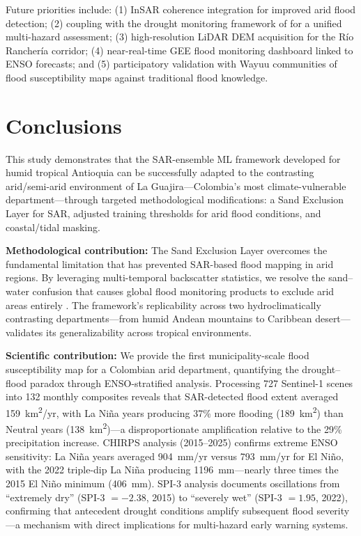 \documentclass{article}
\begin{document}
Future priorities include: (1) InSAR coherence integration for improved arid flood detection; (2) coupling with the drought monitoring framework of \citet{MeraGomez2021} for a unified multi-hazard assessment; (3) high-resolution LiDAR DEM acquisition for the R\'io Rancher\'ia corridor; (4) near-real-time GEE flood monitoring dashboard linked to ENSO forecasts; and (5) participatory validation with Wayuu communities of flood susceptibility maps against traditional flood knowledge.

\section{Conclusions}
\label{sec:conclusions}

This study demonstrates that the SAR-ensemble ML framework developed for humid tropical Antioquia \citep{EspinalMaya2026} can be successfully adapted to the contrasting arid/semi-arid environment of La Guajira---Colombia's most climate-vulnerable department---through targeted methodological modifications: a Sand Exclusion Layer for SAR, adjusted training thresholds for arid flood conditions, and coastal/tidal masking.

\textbf{Methodological contribution:} The Sand Exclusion Layer overcomes the fundamental limitation that has prevented SAR-based flood mapping in arid regions. By leveraging multi-temporal backscatter statistics, we resolve the sand--water confusion that causes global flood monitoring products to exclude arid areas entirely \citep{Garg2024}. The framework's replicability across two hydroclimatically contrasting departments---from humid Andean mountains to Caribbean desert---validates its generalizability across tropical environments.

\textbf{Scientific contribution:} We provide the first municipality-scale flood susceptibility map for a Colombian arid department, quantifying the drought--flood paradox through ENSO-stratified analysis. Processing 727 Sentinel-1 scenes into 132 monthly composites reveals that SAR-detected flood extent averaged \SI{159}{\kilo\metre\squared/yr}, with La Ni\~na years producing 37\% more flooding (\SI{189}{\kilo\metre\squared}) than Neutral years (\SI{138}{\kilo\metre\squared})---a disproportionate amplification relative to the 29\% precipitation increase. CHIRPS analysis (2015--2025) confirms extreme ENSO sensitivity: La Ni\~na years averaged \SI{904}{mm/yr} versus \SI{793}{mm/yr} for El Ni\~no, with the 2022 triple-dip La Ni\~na producing \SI{1196}{mm}---nearly three times the 2015 El Ni\~no minimum (\SI{406}{mm}). SPI-3 analysis documents oscillations from ``extremely dry'' (SPI-3 $= -2.38$, 2015) to ``severely wet'' (SPI-3 $= 1.95$, 2022), confirming that antecedent drought conditions amplify subsequent flood severity---a mechanism with direct implications for multi-hazard early warning systems.
\end{document}
